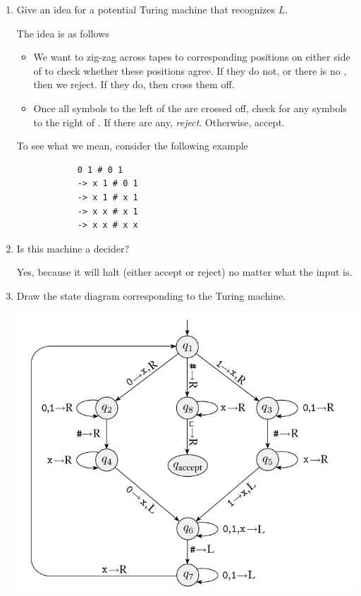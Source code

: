 \documentclass[letterpaper]{article}
\begin{document}
\begin{enumerate}
    \item Give an idea for a potential Turing machine that recognizes $L$.

    \begin{mdframed}[]
        The idea is as follows
        \begin{itemize}
            \item We want to zig-zag across tapes to corresponding positions on either side of \code{\#} to check whether these positions agree. If they do not, or there is no \code{\#}, then we reject. If they do, then cross them off. 
            \item Once all symbols to the left of the \code{\#} are crossed off, check for any symbols to the right of \code{\#}. If there are any, \emph{reject}. Otherwise, accept.
        \end{itemize}
        To see what we mean, consider the following example  
        \begin{verbatim}
            0 1 # 0 1
            -> x 1 # 0 1
            -> x 1 # x 1 
            -> x x # x 1 
            -> x x # x x
        \end{verbatim}
    \end{mdframed}

    \item Is this machine a decider? 
    \begin{mdframed}[]
        Yes, because it will halt (either accept or reject) no matter what the input is. 
    \end{mdframed}

    \item Draw the state diagram corresponding to the Turing machine. 
    \begin{mdframed}[nobreak=true]
        \begin{center}
            \includegraphics[scale=0.7]{../assets/turing_1.png}
        \end{center}


\end{mdframed}
\end{enumerate}
\end{document}

